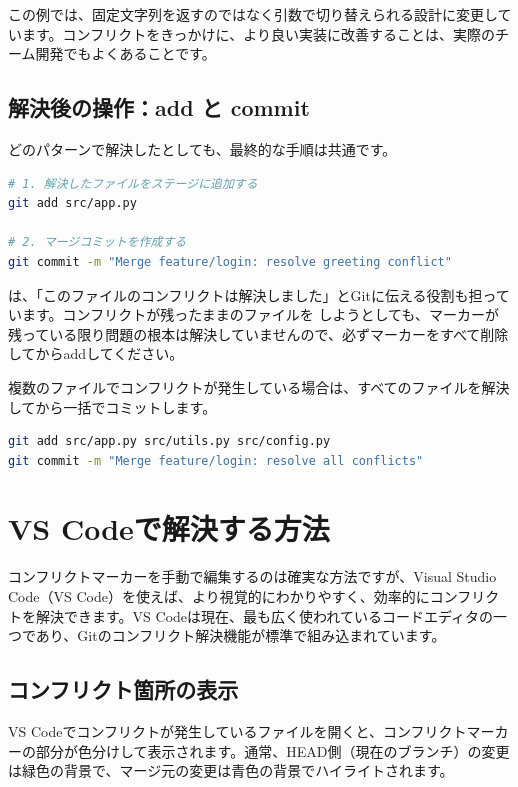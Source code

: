 この例では、固定文字列を返すのではなく引数で切り替えられる設計に変更しています。コンフリクトをきっかけに、より良い実装に改善することは、実際のチーム開発でもよくあることです。

\subsection{解決後の操作：add と commit}

どのパターンで解決したとしても、最終的な手順は共通です。

\begin{lstlisting}[language=bash]
# 1. 解決したファイルをステージに追加する
git add src/app.py

# 2. マージコミットを作成する
git commit -m "Merge feature/login: resolve greeting conflict"
\end{lstlisting}

 は、「このファイルのコンフリクトは解決しました」とGitに伝える役割も担っています。コンフリクトが残ったままのファイルを  しようとしても、マーカーが残っている限り問題の根本は解決していませんので、必ずマーカーをすべて削除してからaddしてください。

複数のファイルでコンフリクトが発生している場合は、すべてのファイルを解決してから一括でコミットします。

\begin{lstlisting}[language=bash]
git add src/app.py src/utils.py src/config.py
git commit -m "Merge feature/login: resolve all conflicts"
\end{lstlisting}

\section{VS Codeで解決する方法}

コンフリクトマーカーを手動で編集するのは確実な方法ですが、Visual Studio Code（VS Code）を使えば、より視覚的にわかりやすく、効率的にコンフリクトを解決できます。VS Codeは現在、最も広く使われているコードエディタの一つであり、Gitのコンフリクト解決機能が標準で組み込まれています。

\subsection{コンフリクト箇所の表示}

VS Codeでコンフリクトが発生しているファイルを開くと、コンフリクトマーカーの部分が色分けして表示されます。通常、HEAD側（現在のブランチ）の変更は緑色の背景で、マージ元の変更は青色の背景でハイライトされます。

